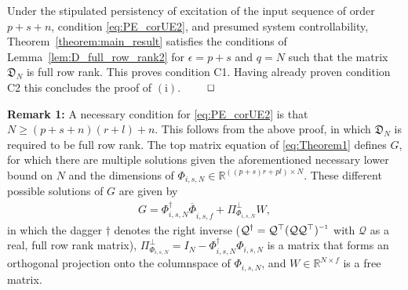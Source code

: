 Under the stipulated persistency of excitation of the input sequence of order $p+s+n$, condition \eqref{eq:PE_corUE2}, and presumed system controllability, Theorem~\ref{theorem:main_result} satisfies the conditions of Lemma~\ref{lem:D_full_row_rank2} for $\epsilon=p+s$ and $q=N$ such that the matrix $\mathfrak{D}_N$ is full row rank. This proves condition C1. Having already proven condition C2 this concludes the proof of $\mathrm{(i)}$. $\hfill\qed$

\noindent\textbf{Remark 1:} A necessary condition for \eqref{eq:PE_corUE2} is that ${N\geq(p+s+n)(r+l)+n}$. This follows from the above proof, in which $\mathfrak{D}_N$ is required to be full row rank. The top matrix equation of \eqref{eq:Theorem1} defines $G$, for which there are multiple solutions given the aforementioned necessary lower bound on $N$ and the dimensions of $\Phi_{i,s,N}\in\mathbb{R}^{((p+s)r+pl)\times N}$. These different possible solutions of $G$ are given by
\begin{align}\label{eq:G_sols}
    G = \Phi_{i,s,N}^\dagger\overline{\Phi}_{\hat{i},s,f} + \Pi_{\Phi_{i,s,N}}^\bot W,
\end{align}
in which the dagger $\dagger$ denotes the right inverse ($\mathcal{Q}^\dagger=\mathcal{Q}^\top(\mathcal{Q}\mathcal{Q}^\top)\inv$ with $\mathcal{Q}$ as a real, full row rank matrix), $\Pi_{\Phi_{i,s,N}}^\bot=I_N-\Phi_{i,s,N}^\dagger\Phi_{i,s,N}$ is a matrix that forms an orthogonal projection onto the columnspace of $\Phi_{i,s,N}$, and $W\in\mathbb{R}^{N\times f}$ is a free matrix.

